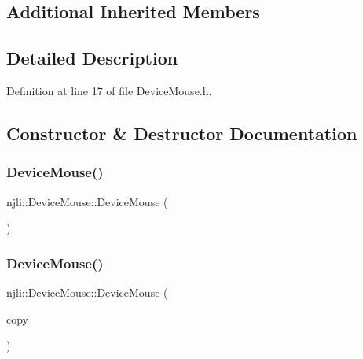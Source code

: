 \subsection*{Additional Inherited Members}


\subsection{Detailed Description}


Definition at line 17 of file Device\+Mouse.\+h.



\subsection{Constructor \& Destructor Documentation}
\mbox{\label{classnjli_1_1_device_mouse_aee8091e8d7089bf8428e73dee2fd4002}} 
\subsubsection{\texorpdfstring{Device\+Mouse()}{DeviceMouse()}\hspace{0.1cm}{\footnotesize\ttfamily [1/2]}}
{\footnotesize\ttfamily njli\+::\+Device\+Mouse\+::\+Device\+Mouse (\begin{DoxyParamCaption}{ }\end{DoxyParamCaption})}

\mbox{\label{classnjli_1_1_device_mouse_a20e7fb08cd22c231a3379e6a492a1fb8}} 
\subsubsection{\texorpdfstring{Device\+Mouse()}{DeviceMouse()}\hspace{0.1cm}{\footnotesize\ttfamily [2/2]}}
{\footnotesize\ttfamily njli\+::\+Device\+Mouse\+::\+Device\+Mouse (\begin{DoxyParamCaption}\item[{const \mbox{\hyperlink{classnjli_1_1_device_mouse}{Device\+Mouse}} \&}]{copy }\end{DoxyParamCaption})}

